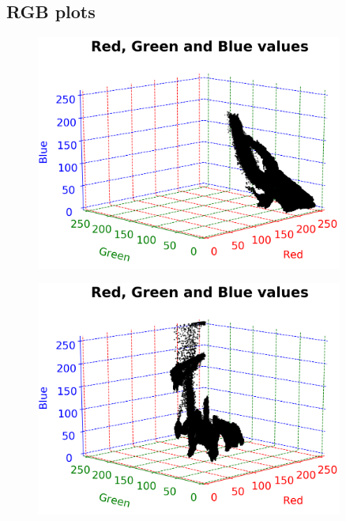 
\subsection{RGB plots}

\begin{figure}[H]
	\centering
	\begin{minipage}{0.5\textwidth}
		\centering
		\includegraphics[width=0.9\textwidth]{img/rgbRed.png}
		\captionsetup{width=0.9\textwidth}
		\label{rgbRedPlot}
	\end{minipage}%
	\begin{minipage}{0.5\textwidth}
		\centering
		\includegraphics[width=0.9\textwidth]{img/rgbYellow.png}
		\captionsetup{width=0.9\textwidth}
		\label{rgbYellowPlot}
	\end{minipage}
\end{figure}

